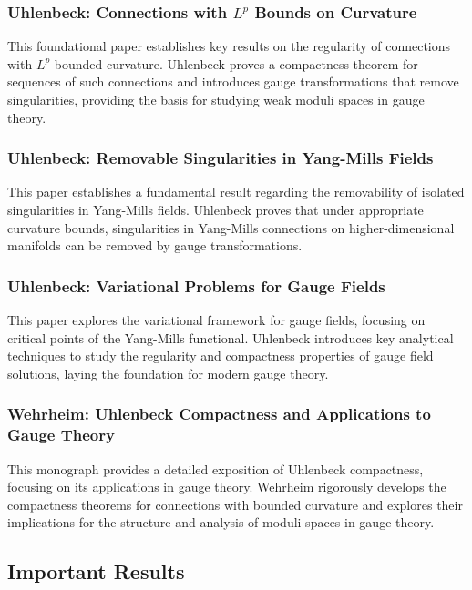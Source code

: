 \documentclass[10pt, letterpaper]{article}
\theoremstyle{custom}
\theoremstyle{definition}
\begin{document}
\subsubsection{Uhlenbeck: Connections with \(L^p\) Bounds on Curvature \cite{uhlenbeck1982connections}} 
This foundational paper establishes key results on the regularity of connections with \(L^p\)-bounded curvature. Uhlenbeck proves a compactness theorem for sequences of such connections and introduces gauge transformations that remove singularities, providing the basis for studying weak moduli spaces in gauge theory.



\subsubsection{Uhlenbeck: Removable Singularities in Yang-Mills Fields \cite{uhlenbeck1982removable}} 
This paper establishes a fundamental result regarding the removability of isolated singularities in Yang-Mills fields. Uhlenbeck proves that under appropriate curvature bounds, singularities in Yang-Mills connections on higher-dimensional manifolds can be removed by gauge transformations.


\subsubsection{Uhlenbeck: Variational Problems for Gauge Fields \cite{uhlenbeck1985variational}} 
This paper explores the variational framework for gauge fields, focusing on critical points of the Yang-Mills functional. Uhlenbeck introduces key analytical techniques to study the regularity and compactness properties of gauge field solutions, laying the foundation for modern gauge theory.


\subsubsection{Wehrheim: Uhlenbeck Compactness and Applications to Gauge Theory \cite{wehrheim2021uhlenbeck}} 
This monograph provides a detailed exposition of Uhlenbeck compactness, focusing on its applications in gauge theory. Wehrheim rigorously develops the compactness theorems for connections with bounded curvature and explores their implications for the structure and analysis of moduli spaces in gauge theory.


\vspace{1cm}

\subsection{Important Results} 
\end{document}
